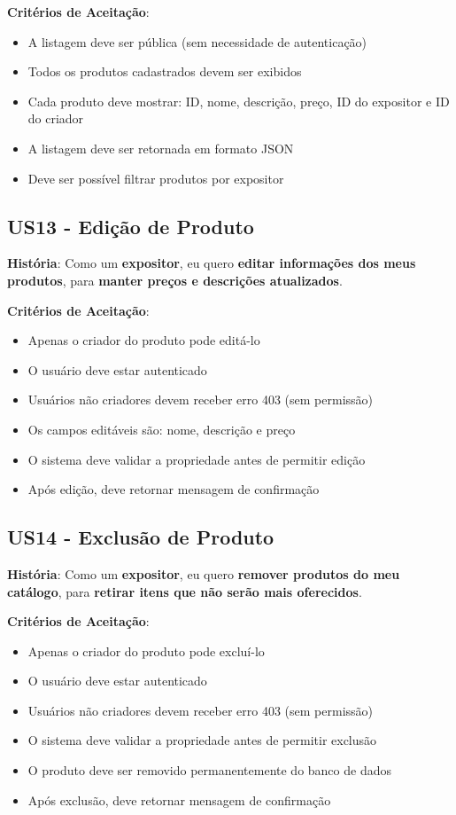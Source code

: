 \documentclass[12pt,a4paper]{article}
\begin{document}
\textbf{Critérios de Aceitação}:
\begin{itemize}
    \item A listagem deve ser pública (sem necessidade de autenticação)
    \item Todos os produtos cadastrados devem ser exibidos
    \item Cada produto deve mostrar: ID, nome, descrição, preço, ID do expositor e ID do criador
    \item A listagem deve ser retornada em formato JSON
    \item Deve ser possível filtrar produtos por expositor
\end{itemize}

\subsection{US13 - Edição de Produto}

\textbf{História}: Como um \textbf{expositor}, eu quero \textbf{editar informações dos meus produtos}, para \textbf{manter preços e descrições atualizados}.

\textbf{Critérios de Aceitação}:
\begin{itemize}
    \item Apenas o criador do produto pode editá-lo
    \item O usuário deve estar autenticado
    \item Usuários não criadores devem receber erro 403 (sem permissão)
    \item Os campos editáveis são: nome, descrição e preço
    \item O sistema deve validar a propriedade antes de permitir edição
    \item Após edição, deve retornar mensagem de confirmação
\end{itemize}

\subsection{US14 - Exclusão de Produto}

\textbf{História}: Como um \textbf{expositor}, eu quero \textbf{remover produtos do meu catálogo}, para \textbf{retirar itens que não serão mais oferecidos}.

\textbf{Critérios de Aceitação}:
\begin{itemize}
    \item Apenas o criador do produto pode excluí-lo
    \item O usuário deve estar autenticado
    \item Usuários não criadores devem receber erro 403 (sem permissão)
    \item O sistema deve validar a propriedade antes de permitir exclusão
    \item O produto deve ser removido permanentemente do banco de dados
    \item Após exclusão, deve retornar mensagem de confirmação
\end{itemize}
\end{document}

